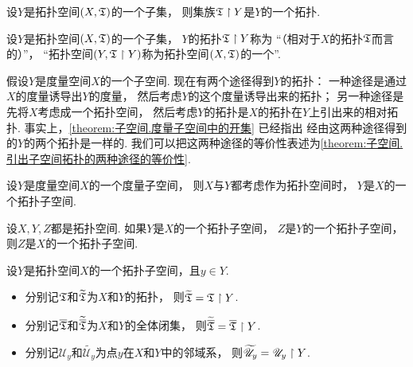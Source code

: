 \begin{lemma}
设\(Y\)是拓扑空间\((X,{\mathfrak T})\)的一个子集，
则集族\({\mathfrak T} \upharpoonright Y\)是\(Y\)的一个拓扑.
\end{lemma}

\begin{definition}
设\(Y\)是拓扑空间\((X,{\mathfrak T})\)的一个子集，
\(Y\)的拓扑\({\mathfrak T} \upharpoonright Y\)称为
“（相对于\(X\)的拓扑\({\mathfrak T}\)而言的）”，
“拓扑空间\((Y,{\mathfrak T} \upharpoonright Y)\)称为拓扑空间\((X,{\mathfrak T})\)的一个”.
\end{definition}

假设\(Y\)是度量空间\(X\)的一个子空间.
现在有两个途径得到\(Y\)的拓扑：
一种途径是通过\(X\)的度量诱导出\(Y\)的度量，
然后考虑\(Y\)的这个度量诱导出来的拓扑；
另一种途径是先将\(X\)考虑成一个拓扑空间，
然后考虑\(Y\)的拓扑是\(X\)的拓扑在\(Y\)上引出来的相对拓扑.
事实上，\cref{theorem:子空间.度量子空间中的开集} 已经指出
经由这两种途径得到的\(Y\)的两个拓扑是一样的.
我们可以把这两种途径的等价性表述为\cref{theorem:子空间.引出子空间拓扑的两种途径的等价性}.
\begin{theorem}\label{theorem:子空间.引出子空间拓扑的两种途径的等价性}
设\(Y\)是度量空间\(X\)的一个度量子空间，
则\(X\)与\(Y\)都考虑作为拓扑空间时，
\(Y\)是\(X\)的一个拓扑子空间.
\end{theorem}

\begin{theorem}\label{theorem:子空间.亲子空间的传递性}
设\(X,Y,Z\)都是拓扑空间.
如果\(Y\)是\(X\)的一个拓扑子空间，
\(Z\)是\(Y\)的一个拓扑子空间，
则\(Z\)是\(X\)的一个拓扑子空间.
\end{theorem}

\begin{theorem}
设\(Y\)是拓扑空间\(X\)的一个拓扑子空间，且\(y \in Y\).
\def\Uy{\mathscr{U}_y}
\def\wUy{\widetilde{\Uy}}
\begin{itemize}
	\item 分别记\({\mathfrak T}\)和\(\widetilde{{\mathfrak T}}\)为\(X\)和\(Y\)的拓扑，
	则\(\widetilde{{\mathfrak T}} = {\mathfrak T} \upharpoonright Y\).
	\item 分别记\(\overline{{\mathfrak T}}\)和\(\widetilde{\overline{{\mathfrak T}}}\)为\(X\)和\(Y\)的全体闭集，
	则\(\widetilde{\overline{{\mathfrak T}}} = \overline{{\mathfrak T}} \upharpoonright Y\).
	\item 分别记\(\Uy\)和\(\wUy\)为点\(y\)在\(X\)和\(Y\)中的邻域系，
	则\(\wUy = \Uy \SetRestrict Y\).
\end{itemize}
\end{theorem}

